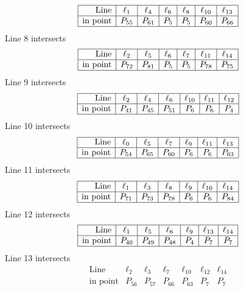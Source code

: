 \documentclass{article}
\begin{document}
{$$\begin{array}{|r*{6}{|c}|}
\hline
\mbox{Line}  & \ell_{1} & \ell_{4} & \ell_{6} & \ell_{8} & \ell_{10} & \ell_{13}\\
\hline
\mbox{in point}  & P_{55} & P_{61} & P_{5} & P_{5} & P_{60} & P_{66}\\
\hline
\end{array}
$$
Line 8 intersects 
$$
\begin{array}{|r*{6}{|c}|}
\hline
\mbox{Line}  & \ell_{2} & \ell_{5} & \ell_{6} & \ell_{7} & \ell_{11} & \ell_{14}\\
\hline
\mbox{in point}  & P_{72} & P_{81} & P_{5} & P_{5} & P_{78} & P_{75}\\
\hline
\end{array}
$$
Line 9 intersects 
$$
\begin{array}{|r*{6}{|c}|}
\hline
\mbox{Line}  & \ell_{2} & \ell_{4} & \ell_{6} & \ell_{10} & \ell_{11} & \ell_{12}\\
\hline
\mbox{in point}  & P_{41} & P_{45} & P_{51} & P_{6} & P_{6} & P_{4}\\
\hline
\end{array}
$$
Line 10 intersects 
$$
\begin{array}{|r*{6}{|c}|}
\hline
\mbox{Line}  & \ell_{0} & \ell_{5} & \ell_{7} & \ell_{9} & \ell_{11} & \ell_{13}\\
\hline
\mbox{in point}  & P_{54} & P_{65} & P_{60} & P_{6} & P_{6} & P_{63}\\
\hline
\end{array}
$$
Line 11 intersects 
$$
\begin{array}{|r*{6}{|c}|}
\hline
\mbox{Line}  & \ell_{1} & \ell_{3} & \ell_{8} & \ell_{9} & \ell_{10} & \ell_{14}\\
\hline
\mbox{in point}  & P_{71} & P_{73} & P_{78} & P_{6} & P_{6} & P_{84}\\
\hline
\end{array}
$$
Line 12 intersects 
$$
\begin{array}{|r*{6}{|c}|}
\hline
\mbox{Line}  & \ell_{1} & \ell_{5} & \ell_{6} & \ell_{9} & \ell_{13} & \ell_{14}\\
\hline
\mbox{in point}  & P_{40} & P_{49} & P_{48} & P_{4} & P_{7} & P_{7}\\
\hline
\end{array}
$$
Line 13 intersects 
$$
\begin{array}{|r*{6}{|c}|}
\hline
\mbox{Line}  & \ell_{2} & \ell_{3} & \ell_{7} & \ell_{10} & \ell_{12} & \ell_{14}\\
\hline
\mbox{in point}  & P_{56} & P_{57} & P_{66} & P_{63} & P_{7} & P_{7}\\

\end{array}$$}
\end{document}
